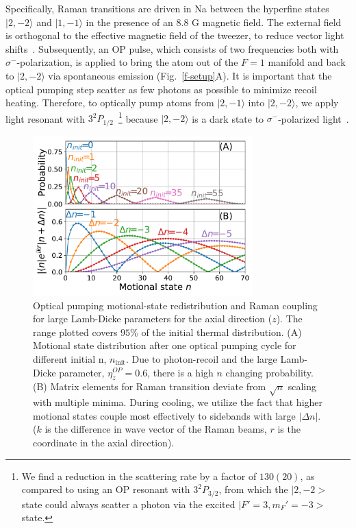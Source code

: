 \documentclass[aps,prl,twocolumn,groupedaddress]{revtex4-1}
\begin{document}
Specifically, Raman transitions are driven in Na between the hyperfine states
$|2, -2\rangle$ and $|1, -1\rangle$ in the presence of an $8.8$ G magnetic field. The external field is
orthogonal to the effective magnetic field of the tweezer, to reduce  vector light shifts~\cite{Kaufman2012,Thompson2013}.
Subsequently, an OP pulse, which consists of two frequencies  both with $\sigma^-$-polarization, is applied  to bring the atom out of the $F=1$ manifold and back to  $|2, -2\rangle$ via spontaneous emission (Fig.~\ref{f-setup}A).
It is important that the optical pumping step scatter as few photons as possible to minimize recoil heating. %
Therefore, to optically pump atoms from $|2,-1\rangle$ into $|2, -2\rangle$, we apply light resonant with  $3^2P_{1/2}$~\footnote{We find a reduction in the scattering rate by a factor of $130(20)$, as compared to using an OP resonant with $3^2P_{3/2}$, from which the $|2, -2>$ state could always scatter a photon via the excited $|F'=3, m_F'=-3>$ state.} because $|2, -2\rangle$ is a dark state to $\sigma^-$-polarized light~\cite{Monroe1995, Grobner2017}.

\begin{figure}[b]
  \includegraphics[width=8.5cm]{imgs/fig2_raman_op.pdf}
  \caption{Optical pumping motional-state redistribution and  Raman coupling for large  Lamb-Dicke parameters for the axial direction ($z$). The range plotted covers $95$\% of the initial thermal distribution.
    (A) Motional state distribution after one optical pumping cycle
    for different initial n, $n_{\textrm{init}}$. Due to photon-recoil and the large Lamb-Dicke parameter, $\eta^{OP}_z=0.6$,
    there is a high  $n$ changing probability.         (B) Matrix elements for Raman transition deviate from
    $\sqrt{n}$ scaling with multiple minima. During cooling, we utilize the fact that higher motional states couple most effectively to sidebands with large $|\Delta n|$.
    ($k$ is the difference in wave vector of the Raman beams,
    $r$ is the coordinate in the axial direction).
    \label{f-ld}}
\end{figure}
\end{document}
